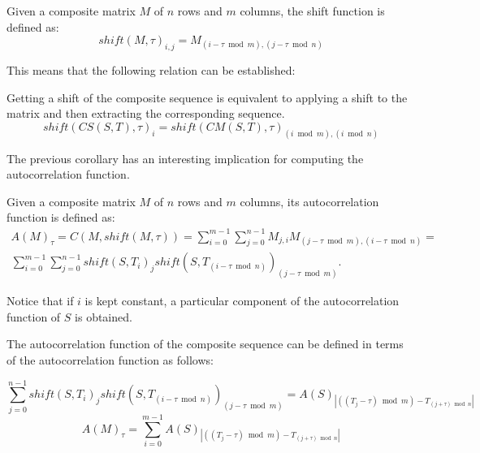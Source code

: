 \begin{definition}
  Given a composite matrix $M$ of $n$ rows and $m$ columns, the shift function
  is defined as:
  \begin{equation}
    shift(M, \tau)_{i, j} = M_{(i-\tau \bmod m), (j-\tau \bmod n)}
  \end{equation}
\end{definition}
This means that the following relation can be established:
  \begin{corollary} Getting a shift of the composite sequence is equivalent to
  applying a shift to the matrix and then extracting the corresponding
  sequence.
    \begin{equation}
      shift(CS(S, T), \tau)_{i} = shift(CM(S, T), \tau)_{(i \bmod m), (i \bmod n)}
    \end{equation}
  \end{corollary}

The previous corollary has an interesting implication for computing the autocorrelation function.

\begin{corollary}
  Given a composite matrix $M$ of $n$ rows and $m$ columns, its
  autocorrelation function is defined as:
  \begin{equation}
    \begin{split}
      A(M)_{\tau} = C(M, shift(M, \tau)) = \sum_{i=0}^{m-1}\sum_{j=0}^{n-1}M_{j, i}M_{(j-\tau \bmod m),(i - \tau \bmod n)} = \\
      \sum_{i=0}^{m-1}\sum_{j=0}^{n-1}shift(S, T_{i})_{j}shift(S, T_{(i - \tau \bmod n)})_{(j-\tau \bmod m)}.
    \end{split}
  \end{equation}
\end{corollary}

Notice that if $i$ is kept constant, a particular component of the
autocorrelation function of $S$ is obtained.

\begin{property} \label{composition:prop:1}
The autocorrelation function of the composite
sequence can be defined in terms of the autocorrelation function as follows:

\begin{equation}
  \sum_{j=0}^{n-1}shift(S, T_{i})_{j}shift(S, T_{(i - \tau \bmod n)})_{(j-\tau \bmod m)} = A(S)_{|((T_{j} - \tau) \bmod m) - T_{(j + \tau) \bmod n}|}
\end{equation}
\begin{equation}
  A(M)_{\tau} = \sum_{i=0}^{m-1} A(S)_{|((T_{j} - \tau) \bmod m) - T_{(j + \tau) \bmod n}|}
\end{equation}

\end{property}

